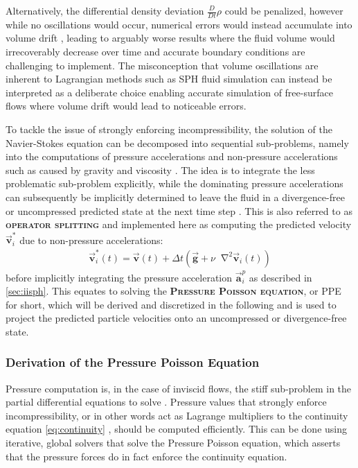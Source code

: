 \documentclass[oneside, a4paper]{book}
\newcommand\emphasis[1]{{\scshape\bfseries#1}}
\newcommand*\Laplace{\mathop{}\!\mathbin\nabla^2}
\newcommand\vek[1]{\vec{\bm{#1}}}
\newcommand\br[1]{\left(#1\right)}
\begin{document}
    Alternatively, the differential density deviation $\frac{D}{Dt}\rho$ could be penalized, however while no oscillations would occur, numerical errors would instead accumulate into volume drift \autocite{tutorial2019}, leading to arguably worse results where the fluid volume would irrecoverably decrease over time and accurate boundary conditions are challenging to implement. The misconception that volume oscillations are inherent to Lagrangian methods such as SPH fluid simulation can instead be interpreted as a deliberate choice enabling accurate simulation of free-surface flows where volume drift would lead to noticeable errors.
  
    To tackle the issue of strongly enforcing incompressibility, the solution of the Navier-Stokes equation can be decomposed into sequential sub-problems, namely into the computations of pressure accelerations and non-pressure accelerations such as caused by gravity and viscosity \autocite{tutorial2019}. The idea is to integrate the less problematic sub-problem explicitly, while the dominating pressure accelerations can subsequently be implicitly determined to leave the fluid in a divergence-free or uncompressed predicted state at the next time step \autocite{tutorial2019}. This is also referred to as \emphasis{operator splitting} \autocite{tutorial2019} and implemented here as computing the predicted velocity $\vek{v}_i^*$ due to non-pressure accelerations:
    \begin{align}
      \vek{v}_i^*\br{t} = \vek{v}\br{t} + \Delta t\br{\vek{g} + \nu\Laplace\vek{v}_i\br{t}}\label{eq:operator-splitting}
    \end{align}
    before implicitly integrating the pressure acceleration $\vek{a}_i^p$ as described in \autoref{sec:iisph}. This equates to solving the \emphasis{Pressure Poisson equation}, or PPE for short, which will be derived and discretized in the following and is used to project the predicted particle velocities onto an uncompressed or divergence-free state.

    \subsubsection{Derivation of the Pressure Poisson Equation}

    Pressure computation is, in the case of inviscid flows, the stiff sub-problem in the partial differential equations to solve \autocite{tutorial2019}. Pressure values that strongly enforce incompressibility, or in other words act as Lagrange multipliers to the continuity equation \autoref{eq:continuity} \autocite{tutorial2019}, should be computed efficiently. This can be done using iterative, global solvers that solve the Pressure Poisson equation, which asserts that the pressure forces do in fact enforce the continuity equation. 
    
\end{document}
